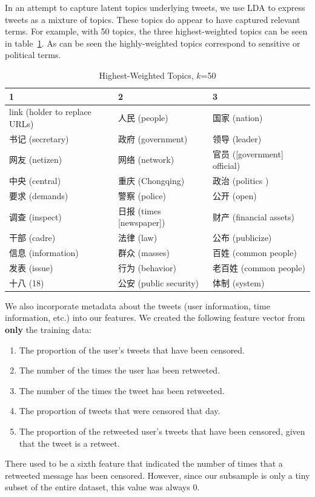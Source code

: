 \documentclass{sig-alternate-05-2015}
\begin{document}
In an attempt to capture latent topics underlying tweets, we use LDA to express tweets as a mixture of topics. These topics do appear to have captured relevant terms. For example, with 50 topics, the three highest-weighted topics can be seen in table~\ref{tab:lda}. As can be seen the highly-weighted topics correspond to sensitive or political terms.

\begin{table}
  \centering
  \begin{tabular}{l|l|l}
    1 & 2 & 3 \\
    \hline
    link (holder to replace URLs) & 人民 (people) & 国家 (nation) \\
    书记 (secretary) & 政府 (government) & 领导 (leader) \\
    网友 (netizen) & 网络 (network) & 官员 ([government] official)\\
    中央 (central) & 重庆 (Chongqing) & 政治 (politics )\\
    要求 (demands) & 警察 (police) & 公开 (open) \\
    调查 (inspect) & 日报 (times [newspaper]) & 财产 (financial assets) \\
    干部 (cadre) & 法律 (law) & 公布 (publicize) \\
    信息 (information) & 群众 (masses) & 百姓 (common people)\\
    发表 (issue) & 行为 (behavior) & 老百姓 (common people) \\
    十八 (18) & 公安 (public security) & 体制 (system) 
  \end{tabular}
  \caption{Highest-Weighted Topics, $k$=50}
  \label{tab:lda}
\end{table}


We also incorporate metadata about the tweets (user information, time information, etc.) into our features. We created the following feature vector from \textbf{only} the training data:
\begin{enumerate}
\item The proportion of the user's tweets that have been censored.
\item The number of the times the user has been retweeted.
\item The number of the times the tweet has been retweeted.
\item The proportion of tweets that were censored that day.
\item The proportion of the retweeted user's tweets that have been censored, given that the tweet is a retweet.
\end{enumerate}
There used to be a sixth feature that indicated the number of times that a retweeted message has been censored. However, since our subsample is only a tiny subset of the entire dataset, this value was always 0.
\end{document}
